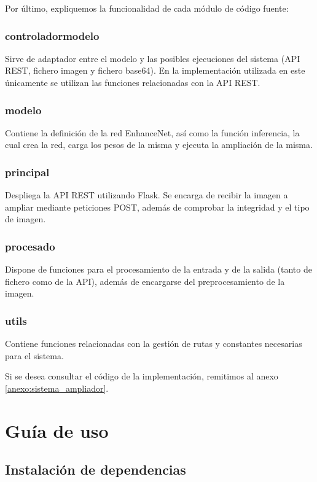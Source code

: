 \documentclass[../main.tex]{subfiles}
\begin{document}
Por último, expliquemos la funcionalidad de cada módulo de código fuente:
    \subsubsection{controlador\textunderscore modelo}
    Sirve de adaptador entre el modelo y las posibles ejecuciones del sistema (API REST, fichero imagen y fichero base64). En la implementación utilizada en este \tfg únicamente se utilizan las funciones relacionadas con la API REST.
    
    \subsubsection{modelo}
    Contiene la definición de la red EnhanceNet, así como la función inferencia, la cual crea la red, carga los pesos de la misma y ejecuta la ampliación de la misma.
    
    \subsubsection{principal}
    Despliega la API REST utilizando Flask. Se encarga de recibir la imagen a ampliar mediante peticiones POST, además de comprobar la integridad y el tipo de imagen.
    
    \subsubsection{procesado}
    Dispone de funciones para el procesamiento de la entrada y de la salida (tanto de fichero como de la API), además de encargarse del preprocesamiento de la imagen.
    
    \subsubsection{utils}
    Contiene funciones relacionadas con la gestión de rutas y constantes necesarias para el sistema.


Si se desea consultar el código de la implementación, remitimos al anexo \ref{anexo:sistema_ampliador}.

\section{Guía de uso}
\subsection{Instalación de dependencias}
\label{sec:dependencias}
\end{document}
